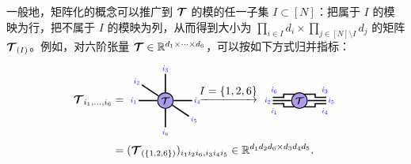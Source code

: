 一般地，矩阵化的概念可以推广到 $\bm{\mathcal{T}}$ 的模的任一子集 $I\subset [N]$：把属于 $I$ 的模映为行，把不属于 $I$ 的模映为列，从而得到大小为 $\prod_{i\in I} d_i \times \prod_{j\in [N]\setminus I} d_j$ 的矩阵 $\bm{\mathcal{T}}_{(I)}$。例如，对六阶张量 $\bm{\mathcal{T}}\in\mathbb{R}^{d_1\times\dots\times d_6}$，可以按如下方式归并指标：
\begin{align*}
\Tt_{i_1,\dots,i_6} 
&=
\begin{tikzpicture}[baseline=\baseline]
    \tikzset{tensor/.style = {minimum size = 0.5cm,shape = circle,thick,draw=black,inner sep = 0pt}, edge/.style = {thick,line width=.4mm},every loop/.style={}}
    \def\y{0}
    \def\x{0}
    \node[tensor,fill=red!20!blue!40!white] (T) at (\x,\y){\scalebox{0.85}{$\Tt$}};
    \draw[edge] (T) -- (\x+0.85,\y) node [very near end,right]
    {\scalebox{0.7}{\indcolor{$i_4$}}};
    \draw[edge] (T) -- (\x,\y-0.85) node [very near end, below]
    {\scalebox{0.7}{\indcolor{$i_6$}}};
    \draw[edge] (T) -- (\x-0.85,\y)node [very near end,left]
    {\scalebox{0.7}{\indcolor{$i_1$}}};
    \draw[edge] (T) -- (\x,\y+0.85) node [very near end,above]
    {\scalebox{0.7}{\indcolor{$i_3$}}};
    \draw[edge] (T) -- (\x-0.75,\y+0.5) node [pos=1.3]
    {\scalebox{0.7}{\indcolor{$i_2$}}};
    \draw[edge] (T) -- (\x+0.75,\y-0.5) node [pos=1.3]
    {\scalebox{0.7}{\indcolor{$i_5$}}};
    \node[draw=none] at (\x+2,\y+0.2){$\underrightarrow{I=\{1,2,6\}}$};
    \end{tikzpicture}
\begin{tikzpicture}[baseline=\baseline]
    \tikzset{tensor/.style = {minimum size = 0.5cm,shape = circle,thick,draw=black,inner sep = 0pt}, edge/.style = {thick,line width=.4mm},every loop/.style={}}
    \def\y{0}
    \def\x{0}
    \node[tensor,fill=red!20!blue!40!white] (T) at (\x,\y){\scalebox{0.85}{$\Tt$}};
    \draw[edge](T) -- (\x+0.85,\y)node [very near end, right]{\scalebox{0.7}{\indcolor{$i_5$}}};
    \draw[edge](\x+0.16,\y+0.2) -- (\x+0.5,\y+0.2) -- (\x+0.5,\y+0.1) -- (\x+0.85,\y+0.1)node [very near end, above]{\scalebox{0.7}{\indcolor{$i_3$}}};
    \draw[edge](\x+0.16,\y-0.2) -- (\x+0.5,\y-0.2) -- (\x+0.5,\y-0.1) -- (\x+0.85,\y-0.1)node [very near end, below]{\scalebox{0.7}{\indcolor{$i_4$}}};
    \draw[edge](T) -- (\x-0.85,\y)node [very near end, left]{\scalebox{0.7}{\indcolor{$i_2$}}};
    \draw[edge](\x-0.16,\y+0.2) -- (\x-0.5,\y+0.2) -- (\x-0.5,\y+0.1) -- (\x-0.85,\y+0.1)node [very near end, above]{\scalebox{0.7}{\indcolor{$i_6$}}};
    \draw[edge](\x-0.16,\y-0.2) -- (\x-0.5,\y-0.2) -- (\x-0.5,\y-0.1) -- (\x-0.85,\y-0.1)node [very near end, below]{\scalebox{0.7}{\indcolor{$i_1$}}};
\end{tikzpicture}\\
&=
(\Tt_{(\{1,2,6\})})_{i_1i_2i_6 , i_3i_4i_5}\in\RR^{d_1d_2d_6\times d_3d_4d_5}.
\end{align*}
